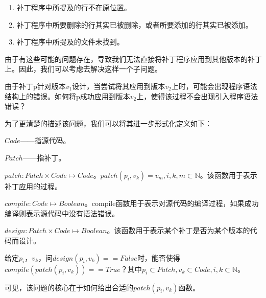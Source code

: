 \begin{enumerate}
	\item 补丁程序中所提及的行不在原位置。
	\item 补丁程序中所要删除的行其实已被删除，或者所要添加的行其实已被添加。
	\item 补丁程序中所提及的文件未找到。
\end{enumerate}

由于有这些可能的问题存在，导致我们无法直接将补丁程序应用到其他版本的补丁上。因此，我们可以考虑去解决这样一个子问题。

\begin{problem}
	\label {patch_reversion}
	由于补丁p针对版本$v_{1}$设计，当尝试将其应用到版本$v_{2}$上时，可能会出现程序语法结构上的错误。如何将p成功应用到版本$v_{2}$上，使得该过程不会出现引入程序语法错误？
\end{problem}

为了更清楚的描述该问题，我们可以将其进一步形式化定义如下：

\begin{definition}
	$Code$——指源代码。
\end{definition}

\begin{definition}
	$Patch$——指补丁。
\end{definition}

\begin{definition}
	$patch: Patch \times Code \mapsto Code$。$patch(p_i,v_k) = v_m,i,k,m \subset \mathbb{N}$。该函数用于表示补丁应用的过程。
\end{definition}

\begin{definition}
	$compile: Code \mapsto Boolean$。compile函数用于表示对源代码的编译过程，如果成功编译则表示源代码中没有语法错误。
\end{definition}

\begin{definition}
	$design: Patch \times Code \mapsto Boolean$。该函数用于表示某个补丁是否为某个版本的代码而设计。
\end{definition}

\begin{problem}
	\label {app_formal}
	给定$p_i$，$v_k$，问$design(p_i,v_k) == False$时，能否使得$compile(patch(p_i,v_k)) == True$？其中$p_i \subset Patch,v_k \subset Code,i,k \subset \mathbb{N}$。
\end{problem}

可见，该问题的核心在于如何给出合适的$patch(p_i,v_k)$函数。


